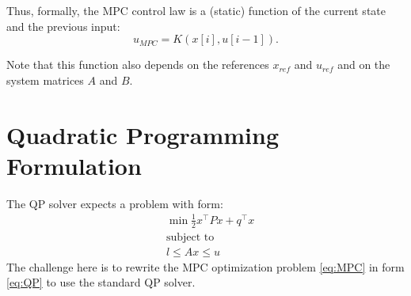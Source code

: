 \documentclass[a4paper,12pt,fleqn]{book}
\begin{document}
Thus, formally, the MPC control law is a (static) function of the current state and the previous input:
\begin{equation}
 u_{MPC} = K(x[i], u[i-1]).
\end{equation}

Note that this function also depends on the references $x_{ref}$ and $u_{ref}$ and on the system matrices $A$ and $B$.

\section{Quadratic Programming Formulation}
The QP solver expects a problem with form: 
\begin{subequations}
\label{eq:QP}
\begin{align}
 &\min \frac{1}{2} x^\top P x +  q^\top x \\
 &\text{subject to} \nonumber \\
 &l \leq Ax \leq u
\end{align}
\end{subequations}
The challenge here is to rewrite the MPC optimization problem \eqref{eq:MPC} in form
\eqref{eq:QP} to use the standard QP solver. 
\end{document}
